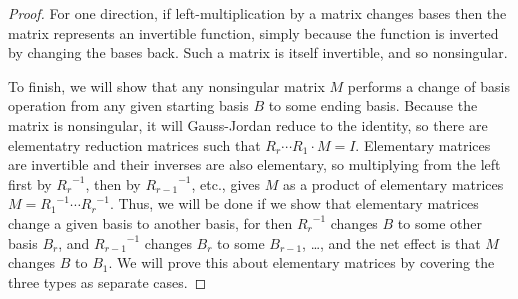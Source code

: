 \begin{proof}
For one direction, if left-multiplication by a matrix changes bases then
the matrix represents an invertible function,
simply because the function is inverted by changing the bases back.
Such a matrix is itself invertible, and so nonsingular.

To finish, we will show that any nonsingular matrix $M$ 
performs a change of basis operation from any given starting basis $B$ 
to some ending basis.
Because the matrix is nonsingular, it will Gauss-Jordan reduce to the
identity, so there are elementatry reduction matrices such that
$R_r\cdots R_1\cdot M=I$.
Elementary matrices are invertible and their inverses are also elementary,
so multiplying from the left first
by ${R_r}^{-1}$, then by ${R_{r-1}}^{-1}$, etc., gives 
$M$ as a product of elementary matrices
$M={R_1}^{-1}\cdots {R_r}^{-1}$.
Thus, we will be done if we show that elementary matrices 
change a given basis to another basis, for then 
${R_r}^{-1}$ changes $B$ to some other basis $B_r$, and
${R_{r-1}}^{-1}$ changes $B_r$ to some $B_{r-1}$, \ldots, and
the net effect is that $M$ changes $B$ to $B_1$.
We will prove this about elementary matrices by covering the three types as
separate cases.


\end{proof}
